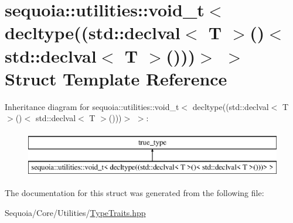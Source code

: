 \hypertarget{structsequoia_1_1utilities_1_1is__orderable_3_01_t_00_01std_1_1void__t_3_01decltype_07_07std_1_1b392cb449bb90b23c6f3d2e2231cedce}{}\section{sequoia\+::utilities\+::void\+\_\+t$<$ decltype((std\+::declval$<$ T $>$()$<$ std\+::declval$<$ T $>$()))$>$ $>$ Struct Template Reference}
\label{structsequoia_1_1utilities_1_1is__orderable_3_01_t_00_01std_1_1void__t_3_01decltype_07_07std_1_1b392cb449bb90b23c6f3d2e2231cedce}
Inheritance diagram for sequoia\+::utilities\+::void\+\_\+t$<$ decltype((std\+::declval$<$ T $>$()$<$ std\+::declval$<$ T $>$()))$>$ $>$\+:\begin{figure}[H]
\begin{center}
\leavevmode
\includegraphics[height=2.000000cm]{structsequoia_1_1utilities_1_1is__orderable_3_01_t_00_01std_1_1void__t_3_01decltype_07_07std_1_1b392cb449bb90b23c6f3d2e2231cedce}
\end{center}
\end{figure}


The documentation for this struct was generated from the following file\+:\begin{DoxyCompactItemize}
\item 
Sequoia/\+Core/\+Utilities/\mbox{\hyperlink{_type_traits_8hpp}{Type\+Traits.\+hpp}}\end{DoxyCompactItemize}
